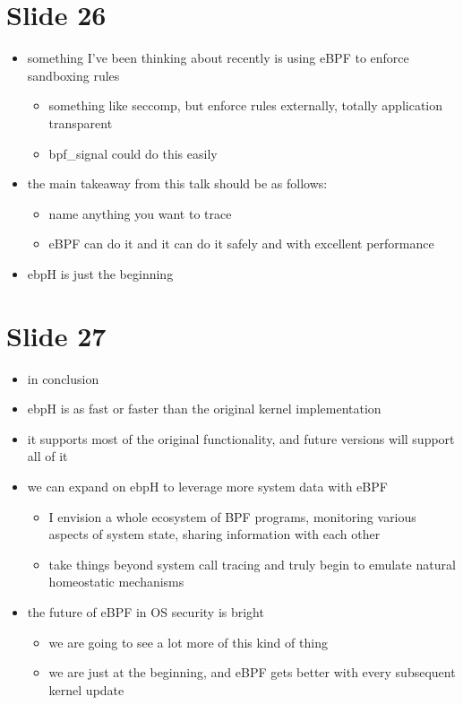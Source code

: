 \documentclass[
  12pt]{findlay}
\providecommand{\tightlist}{\setlength{\itemsep}{0pt}\setlength{\parskip}{0pt}}
\begin{document}
\hypertarget{slide-26}{%
\section{Slide 26}\label{slide-26}}

\begin{itemize}
\tightlist
\item
  something I've been thinking about recently is using eBPF to enforce
  sandboxing rules

  \begin{itemize}
  \tightlist
  \item
    something like seccomp, but enforce rules externally, totally
    application transparent
  \item
    bpf\_signal could do this easily
  \end{itemize}
\item
  the main takeaway from this talk should be as follows:

  \begin{itemize}
  \tightlist
  \item
    name anything you want to trace
  \item
    eBPF can do it and it can do it safely and with excellent
    performance
  \end{itemize}
\item
  ebpH is just the beginning
\end{itemize}

\hypertarget{slide-27}{%
\section{Slide 27}\label{slide-27}}

\begin{itemize}
\tightlist
\item
  in conclusion
\item
  ebpH is as fast or faster than the original kernel implementation
\item
  it supports most of the original functionality, and future versions
  will support all of it
\item
  we can expand on ebpH to leverage more system data with eBPF

  \begin{itemize}
  \tightlist
  \item
    I envision a whole ecosystem of BPF programs, monitoring various
    aspects of system state, sharing information with each other
  \item
    take things beyond system call tracing and truly begin to emulate
    natural homeostatic mechanisms
  \end{itemize}
\item
  the future of eBPF in OS security is bright

  \begin{itemize}
  \tightlist
  \item
    we are going to see a lot more of this kind of thing
  \item
    we are just at the beginning, and eBPF gets better with every
    subsequent kernel update
  \end{itemize}
\end{itemize}
\end{document}
